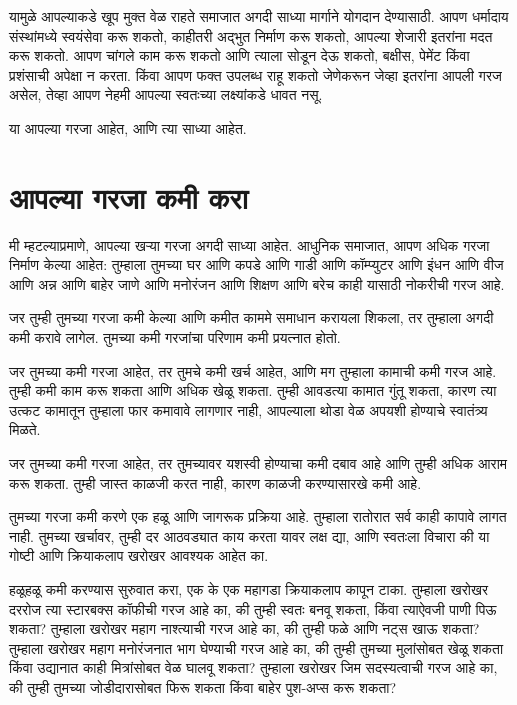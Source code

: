 यामुळे आपल्याकडे खूप मुक्त वेळ राहते समाजात अगदी साध्या मार्गाने योगदान देण्यासाठी. आपण धर्मादाय संस्थांमध्ये स्वयंसेवा करू शकतो, काहीतरी अद्भुत निर्माण करू शकतो, आपल्या शेजारी इतरांना मदत करू शकतो. आपण चांगले काम करू शकतो आणि त्याला सोडून देऊ शकतो, बक्षीस, पेमेंट किंवा प्रशंसाची अपेक्षा न करता. किंवा आपण फक्त उपलब्ध राहू शकतो जेणेकरून जेव्हा इतरांना आपली गरज असेल, तेव्हा आपण नेहमी आपल्या स्वतःच्या लक्ष्यांकडे धावत नसू.

या आपल्या गरजा आहेत, आणि त्या साध्या आहेत.

\chapter{आपल्या गरजा कमी करा}

मी म्हटल्याप्रमाणे, आपल्या खऱ्या गरजा अगदी साध्या आहेत. आधुनिक समाजात, आपण अधिक गरजा निर्माण केल्या आहेत: तुम्हाला तुमच्या घर आणि कपडे आणि गाडी आणि कॉम्प्युटर आणि इंधन आणि वीज आणि अन्न आणि बाहेर जाणे आणि मनोरंजन आणि शिक्षण आणि बरेच काही यासाठी नोकरीची गरज आहे.

जर तुम्ही तुमच्या गरजा कमी केल्या आणि कमीत काममे समाधान करायला शिकला, तर तुम्हाला अगदी कमी करावे लागेल. तुमच्या कमी गरजांचा परिणाम कमी प्रयत्नात होतो.

जर तुमच्या कमी गरजा आहेत, तर तुमचे कमी खर्च आहेत, आणि मग तुम्हाला कामाची कमी गरज आहे. तुम्ही कमी काम करू शकता आणि अधिक खेळू शकता. तुम्ही आवडत्या कामात गुंतू शकता, कारण त्या उत्कट कामातून तुम्हाला फार कमावावे लागणार नाही, आपल्याला थोडा वेळ अपयशी होण्याचे स्वातंत्र्य मिळते.

जर तुमच्या कमी गरजा आहेत, तर तुमच्यावर यशस्वी होण्याचा कमी दबाव आहे आणि तुम्ही अधिक आराम करू शकता. तुम्ही जास्त काळजी करत नाही, कारण काळजी करण्यासारखे कमी आहे.

तुमच्या गरजा कमी करणे एक हळू आणि जागरूक प्रक्रिया आहे. तुम्हाला रातोरात सर्व काही कापावे लागत नाही. तुमच्या खर्चावर, तुम्ही दर आठवड्यात काय करता यावर लक्ष द्या, आणि स्वतःला विचारा की या गोष्टी आणि क्रियाकलाप खरोखर आवश्यक आहेत का.

हळूहळू कमी करण्यास सुरुवात करा, एक के एक महागडा क्रियाकलाप कापून टाका. तुम्हाला खरोखर दररोज त्या स्टारबक्स कॉफीची गरज आहे का, की तुम्ही स्वतः बनवू शकता, किंवा त्याऐवजी पाणी पिऊ शकता? तुम्हाला खरोखर महाग नाश्त्याची गरज आहे का, की तुम्ही फळे आणि नट्स खाऊ शकता? तुम्हाला खरोखर महाग मनोरंजनात भाग घेण्याची गरज आहे का, की तुम्ही तुमच्या मुलांसोबत खेळू शकता किंवा उद्यानात काही मित्रांसोबत वेळ घालवू शकता? तुम्हाला खरोखर जिम सदस्यत्वाची गरज आहे का, की तुम्ही तुमच्या जोडीदारासोबत फिरू शकता किंवा बाहेर पुश-अप्स करू शकता?

